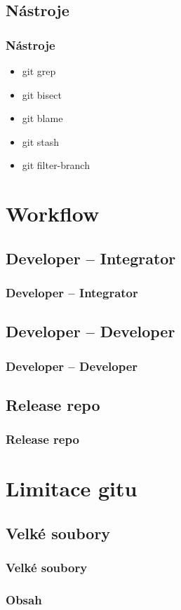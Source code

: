 \documentclass[pdftex]{beamer}
\begin{document}
\subsection{Nástroje}

\begin{frame}
	\frametitle{Nástroje}
	\begin{itemize}
		\item git grep
		\item git bisect
		\item git blame
		\item git stash
		\item git filter-branch
	\end{itemize}
\end{frame}

\section{Workflow}

\subsection{Developer -- Integrator}

\begin{frame}
	\frametitle{Developer -- Integrator}
\end{frame}

\subsection{Developer -- Developer}

\begin{frame}
	\frametitle{Developer -- Developer}
\end{frame}

\subsection{Release repo}

\begin{frame}
	\frametitle{Release repo}
\end{frame}

\section{Limitace gitu}
\subsection{Velké soubory}

\begin{frame}
	\frametitle{Velké soubory}
\end{frame}





\begin{frame}
\frametitle{Obsah}
	\tableofcontents
\end{frame}
\end{document}
